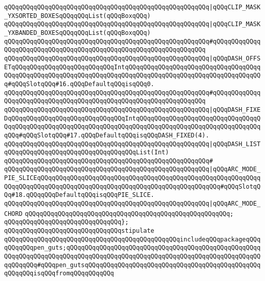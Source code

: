 \verb|qQQqqQQqqQQqqQQqqQQqqQQqqQQqqQQqqQQqqQQqqQQqqQQqqQQqqQQq|\verb#|qQQqCLIP_MASK_YXSORTED_BOXESqQQqqQQqList(qQQqBoxqQQq)#\newline
\verb|qQQqqQQqqQQqqQQqqQQqqQQqqQQqqQQqqQQqqQQqqQQqqQQqqQQqqQQq|\verb#|qQQqCLIP_MASK_YXBANDED_BOXESqQQqqQQqList(qQQqBoxqQQq)#\newline
\verb|qQQqqQQqqQQqqQQqqQQqqQQqqQQqqQQqqQQqqQQqqQQqqQQqqQQqqQQq#qQQqqQQqqQQqqQQqqQQqqQQqqQQqqQQqqQQqqQQqqQQqqQQqqQQqqQQqqQQqqQQqqQQq|\newline
\verb|qQQqqQQqqQQqqQQqqQQqqQQqqQQqqQQqqQQqqQQqqQQqqQQqqQQqqQQq|\verb#|qQQqDASH_OFFSETqQQqqQQqqQQqqQQqqQQqqQQqqQQqIntqQQqqQQqqQQqqQQqqQQqqQQqqQQqqQQqqQQqqQQqqQQqqQQqqQQqqQQqqQQqqQQqqQQqqQQqqQQqqQQqqQQqqQQqqQQqqQQqqQQqqQQqqQQq#\verb|#qQQqSlotqQQq#16.qQQqDefaultqQQqisqQQq0.|\newline
\verb|qQQqqQQqqQQqqQQqqQQqqQQqqQQqqQQqqQQqqQQqqQQqqQQqqQQqqQQq#qQQqqQQqqQQqqQQqqQQqqQQqqQQqqQQqqQQqqQQqqQQqqQQqqQQqqQQqqQQqqQQqqQQq|\newline
\verb|qQQqqQQqqQQqqQQqqQQqqQQqqQQqqQQqqQQqqQQqqQQqqQQqqQQqqQQq|\verb#|qQQqDASH_FIXEDqQQqqQQqqQQqqQQqqQQqqQQqqQQqqQQqIntqQQqqQQqqQQqqQQqqQQqqQQqqQQqqQQqqQQqqQQqqQQqqQQqqQQqqQQqqQQqqQQqqQQqqQQqqQQqqQQqqQQqqQQqqQQqqQQqqQQqqQQqqQQq#\verb|#qQQqSlotqQQq#17.qQQqDefaultqQQqisqQQqDASH_FIXED(4).|\newline
\verb|qQQqqQQqqQQqqQQqqQQqqQQqqQQqqQQqqQQqqQQqqQQqqQQqqQQqqQQq|\verb#|qQQqDASH_LISTqQQqqQQqqQQqqQQqqQQqqQQqqQQqqQQqqQQqList(Int)#\newline
\verb|qQQqqQQqqQQqqQQqqQQqqQQqqQQqqQQqqQQqqQQqqQQqqQQqqQQqqQQq#|\newline
\verb|qQQqqQQqqQQqqQQqqQQqqQQqqQQqqQQqqQQqqQQqqQQqqQQqqQQqqQQq|\verb#|qQQqARC_MODE_PIE_SLICEqQQqqQQqqQQqqQQqqQQqqQQqqQQqqQQqqQQqqQQqqQQqqQQqqQQqqQQqqQQqqQQqqQQqqQQqqQQqqQQqqQQqqQQqqQQqqQQqqQQqqQQqqQQqqQQqqQQqqQQq#\verb|#qQQqSlotqQQq#18.qQQqqQQqDefaultqQQqisqQQqPIE_SLICE.|\newline
\verb|qQQqqQQqqQQqqQQqqQQqqQQqqQQqqQQqqQQqqQQqqQQqqQQqqQQqqQQq|\verb#|qQQqARC_MODE_CHORD#\newline
\verb|qQQqqQQqqQQqqQQqqQQqqQQqqQQqqQQqqQQqqQQqqQQqqQQqqQQqqQQq;|\newline
\verb|qQQqqQQqqQQqqQQqqQQqqQQqqQQqqQQq};|\newline
\newline
\verb|qQQqqQQqqQQqqQQqqQQqqQQqqQQqqQQqstipulate|\newline
\newline
\verb|qQQqqQQqqQQqqQQqqQQqqQQqqQQqqQQqqQQqqQQqqQQqqQQqincludeqQQqpackageqQQqqQQqqQQqpen_guts;qQQqqQQqqQQqqQQqqQQqqQQqqQQqqQQqqQQqqQQqqQQqqQQqqQQqqQQqqQQqqQQqqQQqqQQqqQQqqQQqqQQqqQQqqQQqqQQqqQQqqQQqqQQqqQQqqQQqqQQqqQQqqQQqqQQq#qQQqpen_gutsqQQqqQQqqQQqqQQqqQQqqQQqqQQqqQQqqQQqqQQqqQQqqQQqqQQqqQQqisqQQqfromqQQqqQQqqQQq|\newline
